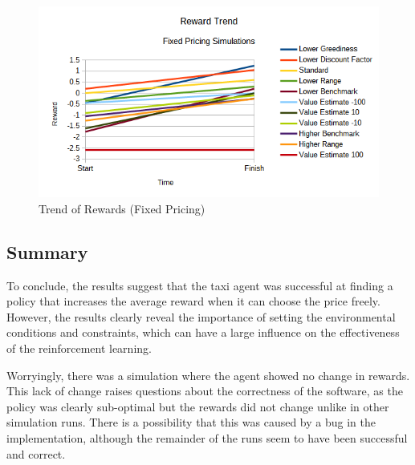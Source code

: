 \begin{figure}
\begin{center}
  \includegraphics[width=\textwidth]{../figures/reward_trend_fixed}
  \caption{
    Trend of Rewards (Fixed Pricing)
    \label{figure:results:fixed_rewards}
  }
\end{center}
\end{figure}

\subsection{Summary}

To conclude, the results suggest that the taxi agent was successful at finding
a policy that increases the average reward when it can choose the price freely.
However, the results clearly reveal the importance of setting the environmental
conditions and constraints, which can have a large influence on the
effectiveness of the reinforcement learning.

Worryingly, there was a simulation where the agent showed no change in
rewards. This lack of change raises questions about the correctness of the
software, as the policy was clearly sub-optimal but the rewards did not change
unlike in other simulation runs. There is a possibility that this was caused by
a bug in the implementation, although the remainder of the runs seem to have
been successful and correct.
